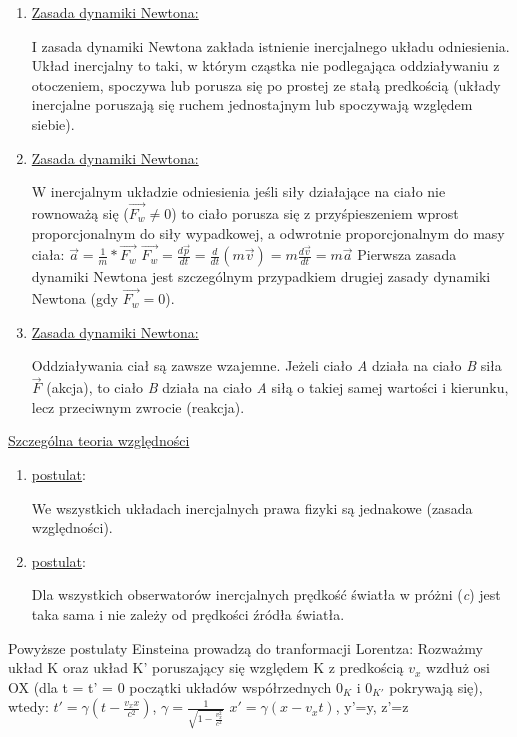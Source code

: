 
\begin{enumerate}[1]
\item \underline{Zasada dynamiki Newtona:}

I zasada dynamiki Newtona zakłada istnienie inercjalnego układu odniesienia. Układ inercjalny to taki, w którym cząstka nie podlegająca oddziaływaniu z otoczeniem, spoczywa lub porusza się po prostej ze stałą predkością (układy inercjalne poruszają się ruchem jednostajnym lub spoczywają względem siebie).

\item \underline{Zasada dynamiki Newtona:}
	
W inercjalnym układzie odniesienia jeśli siły działające na ciało nie rownoważą się ($ \vec{F_w} \neq 0 $) to ciało porusza się z przyśpieszeniem wprost proporcjonalnym do siły wypadkowej, a odwrotnie proporcjonalnym do masy ciała:\newline
$ \vec{a} = \frac{1}{m}*\vec{F_w} $\newline
$ \vec{F_w} = \frac{d\vec{p}}{dt} = \frac{d}{dt}(m\vec{v}) = m\frac{d\vec{v}}{dt} = m\vec{a} $\newline
Pierwsza zasada dynamiki Newtona jest szczególnym przypadkiem drugiej zasady dynamiki Newtona (gdy $ \vec{F_w} = 0 $).

\item \underline{Zasada dynamiki Newtona:}

Oddziaływania ciał są zawsze wzajemne. Jeżeli ciało \textit{A} działa na ciało \textit{B} siła $\vec{F}$ (akcja), to ciało \textit{B} działa na ciało \textit{A} siłą o takiej samej wartości i kierunku, lecz przeciwnym zwrocie (reakcja).
	
\end{enumerate}

\underline{Szczególna teoria względności}

\begin{enumerate}[1]
	\item \underline{postulat}:
	
We wszystkich układach inercjalnych prawa fizyki są jednakowe (zasada względności).

	\item \underline{postulat}:
	
Dla wszystkich obserwatorów inercjalnych prędkość światła w próżni (\textit{c}) jest taka sama i nie zależy od prędkości źródła światła.

\end{enumerate}

Powyższe postulaty Einsteina prowadzą do tranformacji Lorentza:\newline
Rozważmy układ K oraz układ K' poruszający się względem K z predkością $ v_x $ wzdłuż osi OX (dla t = t' = 0 początki układów współrzednych $ 0_K $ i $ 0_{K'} $ pokrywają się), wtedy:\newline
$ t' = \gamma(\textit{t} - \frac{v_xx}{c^2}) $, $\gamma = \frac{1}{\sqrt{1-\frac{v_x^2}{c^2}}}$\newline
$ x'=\gamma(x - v_xt) $, y'=y, z'=z

